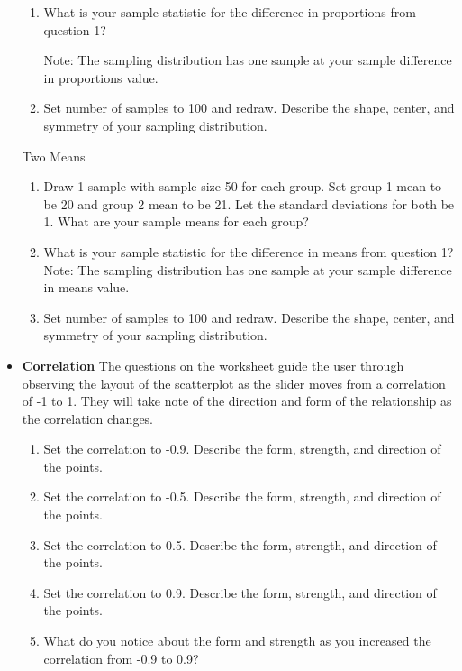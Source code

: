 \documentclass[11pt]{book}
\begin{document}
\begin{itemize}
\begin{enumerate}
\item What is your sample statistic for the difference in proportions from question 1?

Note: The sampling distribution has one sample at your sample difference in proportions value.

\item Set number of samples to 100 and redraw. Describe the shape, center, and symmetry of your sampling distribution. 
\end{enumerate}

Two Means
\begin{enumerate}
\item Draw 1 sample with sample size 50 for each group. Set group 1 mean to be 20 and group 2 mean to be 21.  Let the standard deviations for both be 1. What are your sample means for each group?

\item What is your sample statistic for the difference in means from question 1? Note: The sampling distribution has one sample at your sample difference in means value.

\item Set number of samples to 100 and redraw. Describe the shape, center, and symmetry of your sampling distribution. 
\end{enumerate}
  
\item {\bf Correlation} The questions on the worksheet guide the user through observing the layout of the scatterplot as the slider moves from a correlation of -1 to 1. They will take note of the direction and form of the relationship as the correlation changes. 

\begin{enumerate}
\item Set the correlation to -0.9. Describe the form, strength, and direction of the points.

\item Set the correlation to -0.5. Describe the form, strength, and direction of the points.

\item Set the correlation to 0.5. Describe the form, strength, and direction of the points.

\item Set the correlation to 0.9. Describe the form, strength, and direction of the points.

\item What do you notice about the form and strength as you increased the correlation from -0.9 to 0.9?
\end{enumerate}


\end{itemize}
\end{document}
